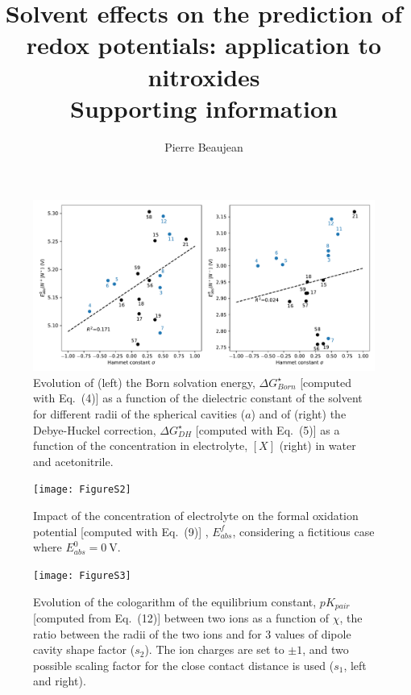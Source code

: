 \documentclass[11pt,a4paper]{article}
\title{Solvent effects on the prediction of redox potentials: application to nitroxides\\ Supporting information}
\author{Pierre Beaujean}
\begin{document}
\maketitle


\renewcommand{\thetable}{S\arabic{table}}
\renewcommand{\thefigure}{S\arabic{figure}}

\begin{figure}[!h]
	\centering
	\includegraphics [width=\linewidth]{FigureS1}
	\caption{Evolution of (left) the Born solvation energy, $\Delta G^\star_{Born}$ [computed with Eq.~(4)] as a function of the dielectric constant of the solvent for different radii of  the spherical cavities ($a$) and of (right) the Debye-Huckel correction, $\Delta G^\star_{DH}$  [computed with Eq.~(5)] as a function of the concentration in electrolyte, $[X]$ (right) in water and acetonitrile.}
\end{figure}

\begin{figure}[!h]
\centering
\texttt{[image: FigureS2]}
\caption{Impact of the concentration of electrolyte on the formal oxidation potential [computed with Eq.~(9)] , $E^f_{abs}$, considering a fictitious case where $E^0_{abs} = \SI{0}{\volt}$.}
\end{figure}

\begin{figure}[!h]
\centering
\texttt{[image: FigureS3]}
\caption{Evolution of the cologarithm of the equilibrium constant, $pK_{pair}$ [computed from Eq.~(12)] between two ions as a function of $\chi$, the ratio between the radii of the two ions and for 3 values of dipole cavity shape factor ($s_2$). The ion charges are set to $\pm 1$, and two possible scaling factor for  the close contact distance is used ($s_1$, left and right). }
\end{figure}
\end{document}
